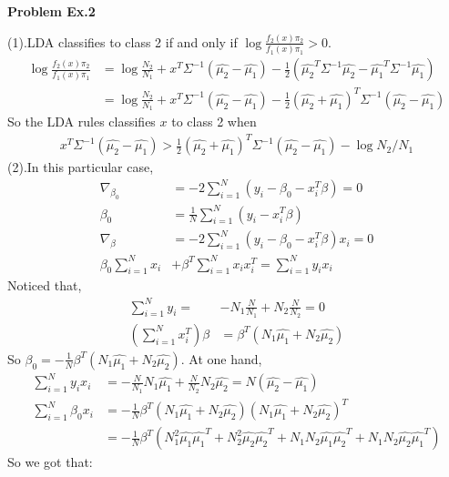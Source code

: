 \documentclass[UTF8,12pt]{article}
\newenvironment{problem}[2][Problem]
{ \begin{mdframed}[backgroundcolor=gray!20] \textbf{#1 #2}}
	{  \end{mdframed}}
\newenvironment{answer}
{}
{}
\newenvironment{eq}
{
	\begin{equation}
		\begin{aligned}\nonumber
}
{
		\end{aligned}
	\end{equation}
}
\begin{document}
\begin{problem}{Ex.2}
\end{problem}
\begin{answer}
	(1).LDA classifies to class 2 if and only if $\log{\frac{f_2(x)\pi_2}{f_1(x)\pi_1}}>0$.
	\begin{eq}
		\log{\frac{f_2(x)\pi_2}{f_1(x)\pi_1}}
		&= \log{\frac{N_2}{N_1}} + x^T \Sigma^{-1} (\hat{\mu_2}-\hat{\mu_1})- 
		\frac{1}{2}(\hat{\mu_2}^T \Sigma^{-1} \hat{\mu_2} -\hat{\mu_1}^T \Sigma^{-1} \hat{\mu_1})\\
		&= \log{\frac{N_2}{N_1}} + x^T \Sigma^{-1} (\hat{\mu_2}-\hat{\mu_1}) -
		\frac{1}{2}(\hat{\mu_2} + \hat{\mu_1})^T \Sigma^{-1}(\hat{\mu_2} - \hat{\mu_1})
	\end{eq}
	So the LDA rules classifies $x$ to class 2 when
	\begin{eq}
		x^T \Sigma^{-1} (\hat{\mu_2}-\hat{\mu_1}) > 
		\frac{1}{2}(\hat{\mu_2} + \hat{\mu_1})^T \Sigma^{-1}(\hat{\mu_2} - \hat{\mu_1}) - \log{{N_2}/{N_1}}
	\end{eq}
	(2).In this particular case, 
	\begin{eq}
		\nabla_{\beta_0} &= -2\sum_{i=1}^N (y_i-\beta_0-x_i^T\beta)=0\\
		\beta_0 &= \frac{1}{N}\sum_{i=1}^N (y_i-x^T_i\beta)\\
		\nabla_{\beta}&= -2\sum_{i=1}^N (y_i-\beta_0-x_i^T\beta)x_i=0\\
		\beta_0 \sum_{i=1}^N x_i &+ \beta^T \sum_{i=1}^N x_i x_i^T = \sum_{i=1}^N y_ix_i
	\end{eq}
	Noticed that,
	\begin{eq}
		\sum_{i=1}^N y_i=&-N_1\frac{N}{N_1}+N_2\frac{N}{N_2}=0\\
		(\sum_{i=1}^N x^T_i)\beta &= \beta^T(N_1\hat{\mu_1}+N_2\hat{\mu_2})
	\end{eq}
	So $\beta_0=-\frac{1}{N}\beta^T(N_1\hat{\mu_1}+N_2\hat{\mu_2}) $. At one hand,
	\begin{eq}
		\sum_{i=1}^N y_ix_i &= -\frac{N}{N_1}N_1 \hat{\mu_1} +\frac{N}{N_2}N_2 \hat{\mu_2}
		= N(\hat{\mu_2}-\hat{\mu_1})\\
		\sum_{i=1}^N \beta_0 x_i &= -\frac{1}{N}\beta^T 
		(N_1\hat{\mu_1}+N_2\hat{\mu_2})(N_1\hat{\mu_1}+N_2\hat{\mu_2})^T\\
		&= -\frac{1}{N}\beta^T(N_1^2 \hat{\mu_1}\hat{\mu_1}^T + N_2^2 \hat{\mu_2}\hat{\mu_2}^T
		+N_1 N_2 \hat{\mu_1}\hat{\mu_2}^T+N_1 N_2 \hat{\mu_2}\hat{\mu_1}^T)
	\end{eq}
	So we got that:
	\begin{equation}

\end{equation}
\end{answer}
\end{document}
